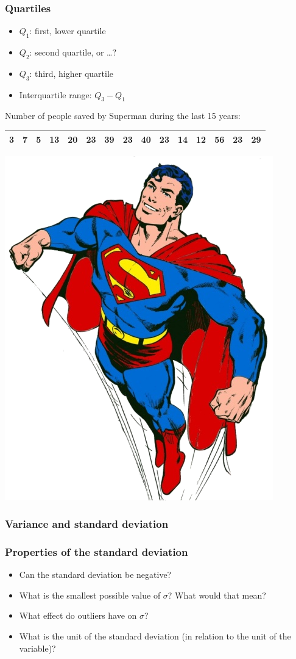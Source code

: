 \documentclass{beamer}
\begin{document}
\begin{frame}
  \frametitle{Quartiles}


  \begin{itemize}
    \item $Q_1$: first, lower quartile
    \item $Q_2$: second quartile, or \ldots?
    \item $Q_3$: third, higher quartile
    \item Interquartile range: $Q_3 - Q_1$
  \end{itemize}

  \begin{center}
    Number of people saved by Superman during the last 15 years:
    \begin{tabular}{|c|c|c|c|c|c|c|c|c|c|c|c|c|c|c|}
      \hline
      3&7&5&13&20&23&39&23&40&23&14&12&56&23&29\\
      \hline
    \end{tabular}
    \includegraphics[width=.7cm]{img/les2-hero-3}
  \end{center}

\end{frame}

\begin{frame}
  \frametitle{Variance and standard deviation}


  \vspace{1em}

  
\end{frame}

\begin{frame}
  \frametitle{Properties of the standard deviation}

  \begin{itemize}
    \item<+-> Can the standard deviation be negative?
    \item<+-> What is the smallest possible value of $\sigma$? What would that mean?
    \item<+-> What effect do outliers have on $\sigma$?
    \item<+-> What is the unit of the standard deviation (in relation to the unit of the variable)?
  \end{itemize}
\end{frame}
\end{document}
